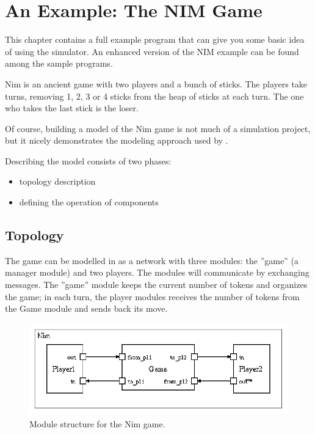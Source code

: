 \chapter{An Example: The NIM Game}
\label{cha:the-nim-game}


This chapter contains a full example program that can give you 
some basic idea of using the simulator. An enhanced version of 
the NIM example can be found among the sample programs.

Nim is an ancient game with two players and a bunch of sticks. 
The players take turns, removing 1, 2, 3 or 4 sticks from the 
heap of sticks at each turn. The one who takes the last stick 
is the loser. 


Of course, building a model of the Nim game is not much of a 
simulation project, but it nicely demonstrates the modeling approach 
used by {\opp}.


Describing the model consists of two phases:
\begin{itemize}
\item{topology description}
\item{defining the operation of components}
\end{itemize}



\section{Topology}

The game can be modelled in {\opp} as a network with three modules: 
the ''game'' (a manager module) and two players. 
The modules will communicate by exchanging messages. The ''game'' 
module keeps the current number of tokens and organizes the game; 
in each turn, the player modules receives the number of tokens 
from the Game module and sends back its move.

\begin{figure}[htbp]
\begin{center}
\includegraphics[width=4.483in, height=1.568in]{figures/usmanFig6}
\caption{Module structure for the Nim game.}
\end{center}
\end{figure}

